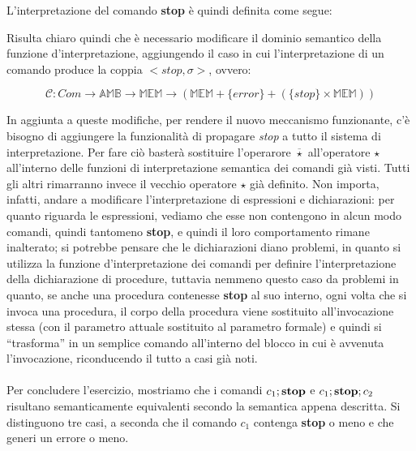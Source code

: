     L'interpretazione del comando \textbf{stop} è quindi definita come segue:
    
    
    Risulta chiaro quindi che è necessario modificare il dominio semantico della funzione d'interpretazione, aggiungendo il caso in cui l'interpretazione di un comando produce la coppia $<stop,\sigma>$, ovvero:
    
    \begin{equation*}
        \mathcal{C} : Com \rightarrow \mathbb{AMB} \rightarrow \mathbb{MEM} \rightarrow (\mathbb{MEM} + \{error\} + (\{stop\} \times \mathbb{MEM}))
    \end{equation*}
    
    In aggiunta a queste modifiche, per rendere il nuovo meccanismo funzionante, c'è bisogno di aggiungere la funzionalità di propagare \textit{stop} a tutto il sistema di interpretazione. Per fare ciò basterà sostituire l'operarore $\overline{\star}$ all'operatore $\star$ all'interno delle funzioni di interpretazione semantica dei comandi già visti. Tutti gli altri rimarranno invece il vecchio operatore $\star$ già definito. Non importa, infatti, andare a modificare l'interpretazione di espressioni e dichiarazioni: per quanto riguarda le espressioni, vediamo che esse non contengono in alcun modo comandi, quindi tantomeno \textbf{stop}, e quindi il loro comportamento rimane inalterato; si potrebbe pensare che le dichiarazioni diano problemi, in quanto si utilizza la funzione d'interpretazione dei comandi per definire l'interpretazione della dichiarazione di procedure, tuttavia nemmeno questo caso da problemi in quanto, se anche una procedura contenesse \textbf{stop} al suo interno, ogni volta che si invoca una procedura, il corpo della procedura viene sostituito all'invocazione stessa (con il parametro attuale sostituito al parametro formale) e quindi si ``trasforma'' in un semplice comando all'interno del blocco in cui è avvenuta l'invocazione, riconducendo il tutto a casi già noti.\\
    \\
    Per concludere l'esercizio, mostriamo che i comandi $c_1;\mbox{\textbf{stop}}$ e $c_1;\mbox{\textbf{stop}};c_2$ risultano semanticamente equivalenti secondo la semantica appena descritta. Si distinguono tre casi, a seconda che il comando $c_1$ contenga \textbf{stop} o meno e che generi un errore o meno.
    
